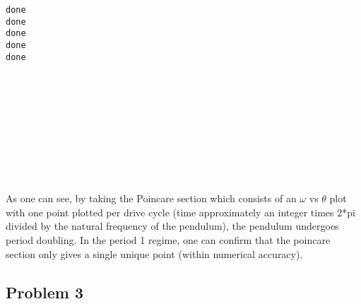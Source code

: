 \documentclass[11pt]{article}
\begin{document}
    \begin{Verbatim}[commandchars=\\\{\}]
done
done
done
done
done

    \end{Verbatim}

    \begin{center}
    \end{center}
    { \hspace*{\fill} \\}
    
    \begin{center}
    \end{center}
    { \hspace*{\fill} \\}
    
    \begin{center}
    \end{center}
    { \hspace*{\fill} \\}
    
    \begin{center}
    \end{center}
    { \hspace*{\fill} \\}
    
    \begin{center}
    \end{center}
    { \hspace*{\fill} \\}
    
    As one can see, by taking the Poincare section which consists of an
\(\omega\) vs \(\theta\) plot with one point plotted per drive cycle
(time approximately an integer times 2*pi divided by the natural
frequency of the pendulum), the pendulum undergoes period doubling. In
the period 1 regime, one can confirm that the poincare section only
gives a single unique point (within numerical accuracy).

    \hypertarget{problem-3}{%
\subsection{Problem 3}\label{problem-3}}
\end{document}
